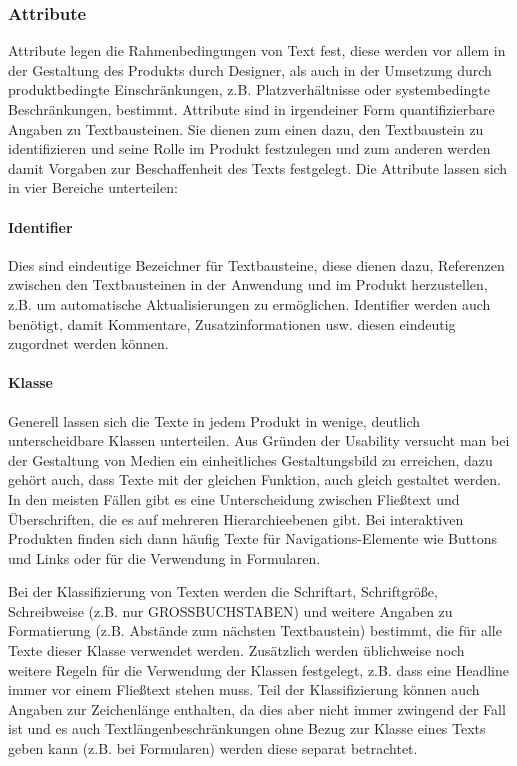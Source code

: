 \subsubsection{Attribute} 

Attribute legen die Rahmenbedingungen von Text fest, diese werden vor allem in der Gestaltung des Produkts durch Designer, als auch in der Umsetzung durch produktbedingte Einschränkungen, z.B. Platzverhältnisse oder systembedingte Beschränkungen, bestimmt. Attribute sind in irgendeiner Form quantifizierbare Angaben zu Textbausteinen. Sie dienen zum einen dazu, den Textbaustein zu identifizieren und seine Rolle im Produkt festzulegen und zum anderen werden damit Vorgaben zur Beschaffenheit des Texts festgelegt. Die Attribute lassen sich in vier Bereiche unterteilen:

\paragraph{Identifier} Dies sind eindeutige Bezeichner für Textbausteine, diese dienen dazu, Referenzen zwischen den Textbausteinen in der Anwendung und im Produkt herzustellen, z.B. um automatische Aktualisierungen zu ermöglichen. Identifier werden auch benötigt, damit Kommentare, Zusatzinformationen usw. diesen eindeutig zugordnet werden können.

\paragraph{Klasse} Generell lassen sich die Texte in jedem Produkt in wenige, deutlich unterscheidbare Klassen unterteilen. Aus Gründen der Usability versucht man bei der Gestaltung von Medien ein einheitliches Gestaltungsbild zu erreichen, dazu gehört auch, dass Texte mit der gleichen Funktion, auch gleich gestaltet werden. In den meisten Fällen gibt es eine Unterscheidung zwischen Fließtext und Überschriften, die es auf mehreren Hierarchieebenen gibt. Bei interaktiven Produkten finden sich dann häufig Texte für Navigations-Elemente wie Buttons und Links oder für die Verwendung in Formularen. 

Bei der Klassifizierung von Texten werden die Schriftart, Schriftgröße, Schreibweise  (z.B. nur GROSSBUCHSTABEN) und weitere Angaben zu Formatierung (z.B. Abstände zum nächsten Textbaustein) bestimmt, die für alle Texte dieser Klasse verwendet werden. Zusätzlich werden üblichweise noch weitere Regeln für die Verwendung der Klassen festgelegt, z.B. dass eine Headline immer vor einem Fließtext stehen muss. Teil der Klassifizierung können auch Angaben zur Zeichenlänge enthalten, da dies aber nicht immer zwingend der Fall ist und es auch Textlängenbeschränkungen ohne Bezug zur Klasse eines Texts geben kann (z.B. bei Formularen) werden diese separat betrachtet.

